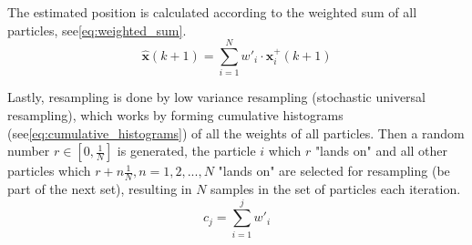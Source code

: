 The estimated position is calculated according to the weighted sum of all particles, see\:\eqref{eq:weighted_sum}.
\begin{equation}
    \label{eq:weighted_sum}
    \hat{\mathbf{x}} (k+1) = \sum_{i=1}^N w'_i \cdot \mathbf{x}_i^+(k+1)
\end{equation}

Lastly, resampling is done by low variance resampling (stochastic universal resampling), which works by forming cumulative histograms (see\:\eqref{eq:cumulative_histograms}\:\cite{corke_robotics_2023}) of all the weights of all particles. Then a random number $r \in [0, \frac{1}{N}]$ is generated, the particle $i$ which $r$ "lands on" and all other particles which $r + n\frac{1}{N}, n = 1,2,...,N$ "lands on" are selected for resampling (be part of the next set), resulting in $N$ samples in the set of particles each iteration.  
\begin{equation}
    \label{eq:cumulative_histograms}
    c_j = \sum_{i = 1}^j w'_i
\end{equation}



\begin{comment}
    \subsection{Assignment}
    \subsubsection{Theoretical equations for the differential drive robot}
    \begin{itemize}
        \item \textbf{EKF}: prediction
        \item \textbf{EKF}: correction
    \end{itemize}
\end{comment}
